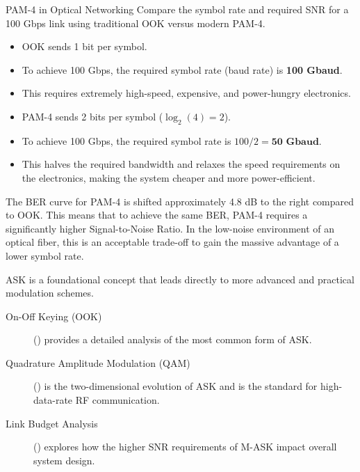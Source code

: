 \begin{workedexample}{PAM-4 in Optical Networking}
     Compare the symbol rate and required SNR for a 100 Gbps link using traditional OOK versus modern PAM-4.
    
    \begin{itemize}
        \item OOK sends 1 bit per symbol.
        \item To achieve 100 Gbps, the required symbol rate (baud rate) is \textbf{100 Gbaud}.
        \item This requires extremely high-speed, expensive, and power-hungry electronics.
    \end{itemize}

    \begin{itemize}
        \item PAM-4 sends 2 bits per symbol ($\log_2(4)=2$).
        \item To achieve 100 Gbps, the required symbol rate is $100 / 2 = \textbf{50 Gbaud}$.
        \item This halves the required bandwidth and relaxes the speed requirements on the electronics, making the system cheaper and more power-efficient.
    \end{itemize}
     The BER curve for PAM-4 is shifted approximately 4.8 dB to the right compared to OOK. This means that to achieve the same BER, PAM-4 requires a significantly higher Signal-to-Noise Ratio. In the low-noise environment of an optical fiber, this is an acceptable trade-off to gain the massive advantage of a lower symbol rate.
\end{workedexample}


\begin{importantbox}[title={Further Reading}]
    ASK is a foundational concept that leads directly to more advanced and practical modulation schemes.
    \begin{description}
        \item[On-Off Keying (OOK)] () provides a detailed analysis of the most common form of ASK.
        \item[Quadrature Amplitude Modulation (QAM)] () is the two-dimensional evolution of ASK and is the standard for high-data-rate RF communication.
        \item[Link Budget Analysis] () explores how the higher SNR requirements of M-ASK impact overall system design.
    \end{description}
\end{importantbox}
